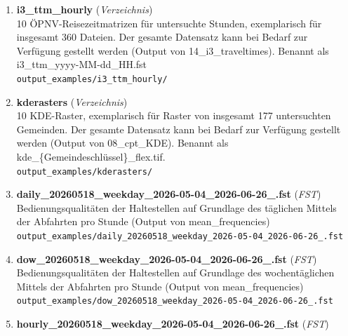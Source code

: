 \begin{enumerate}[label=A\arabic*, ref=A\arabic*, leftmargin=*, itemsep=0.5em, topsep=0.3em]
\begin{enumerate}[label=A\arabic{enumi}-\arabic*, ref=A\arabic{enumi}-\arabic*, leftmargin=*, itemsep=0.5em, topsep=0.3em]
\begin{enumerate}[label=A\arabic{enumi}-\arabic{enumii}-\arabic*, ref=A\arabic{enumi}-\arabic{enumii}-\arabic*, leftmargin=*, itemsep=0.5em, topsep=0.3em]
\texttt{\small output\_examples/i3\_shortest\_hourly/captured\_mintt.fst}
\edef\appendixlabelkey{app:A\arabic{enumi}-\arabic{enumii}-\arabic{enumiii}}
\expandafter\label\expandafter{\appendixlabelkey}
\end{enumerate}
\item \textbf{i3\_ttm\_hourly} \textnormal{(\textit{Verzeichnis})}\\
10 ÖPNV-Reisezeitmatrizen für untersuchte Stunden, exemplarisch für insgesamt 360 Dateien. Der gesamte Datensatz kann bei Bedarf zur Verfügung gestellt werden (Output von 14\_i3\_traveltimes).
Benannt als i3\_ttm\_yyyy-MM-dd\_HH.fst\\
\texttt{\small output\_examples/i3\_ttm\_hourly/}
\edef\appendixlabelkey{app:A\arabic{enumi}-\arabic{enumii}}
\expandafter\label\expandafter{\appendixlabelkey}
\item \textbf{kderasters} \textnormal{(\textit{Verzeichnis})}\\
10 KDE-Raster, exemplarisch für Raster von insgesamt 177 untersuchten Gemeinden. Der gesamte Datensatz kann bei Bedarf zur Verfügung gestellt werden (Output von 08\_cpt\_KDE).
Benannt als kde\_\{Gemeindeschlüssel\}\_flex.tif.\\
\texttt{\small output\_examples/kderasters/}
\edef\appendixlabelkey{app:A\arabic{enumi}-\arabic{enumii}}
\expandafter\label\expandafter{\appendixlabelkey}
\item \textbf{daily\_20260518\_weekday\_2026-05-04\_2026-06-26\_.fst} \textnormal{(\textit{FST})}\\
Bedienungsqualitäten der Haltestellen auf Grundlage des täglichen Mittels der Abfahrten pro Stunde (Output von mean\_frequencies)\\
\texttt{\small output\_examples/daily\_20260518\_weekday\_2026-05-04\_2026-06-26\_.fst}
\edef\appendixlabelkey{app:A\arabic{enumi}-\arabic{enumii}}
\expandafter\label\expandafter{\appendixlabelkey}
\item \textbf{dow\_20260518\_weekday\_2026-05-04\_2026-06-26\_.fst} \textnormal{(\textit{FST})}\\
Bedienungsqualitäten der Haltestellen auf Grundlage des wochentäglichen Mittels der Abfahrten pro Stunde (Output von mean\_frequencies)\\
\texttt{\small output\_examples/dow\_20260518\_weekday\_2026-05-04\_2026-06-26\_.fst}
\edef\appendixlabelkey{app:A\arabic{enumi}-\arabic{enumii}}
\expandafter\label\expandafter{\appendixlabelkey}
\item \textbf{hourly\_20260518\_weekday\_2026-05-04\_2026-06-26\_.fst} \textnormal{(\textit{FST})}\\

\end{enumerate}
\end{enumerate}
